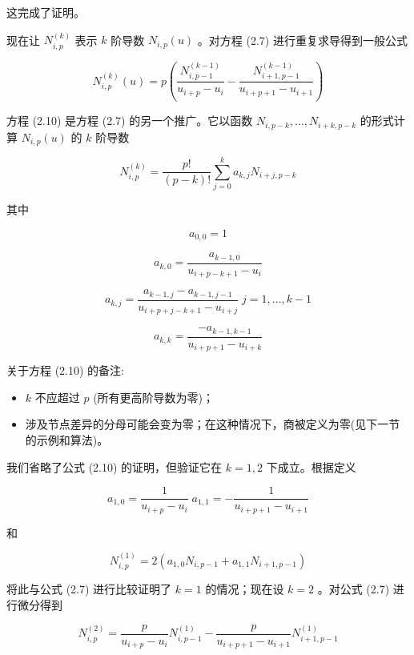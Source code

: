 \documentclass[../main.tex]{subfiles}
\begin{document}
这完成了证明。

现在让 \({N}_{i,p}^{\left( k\right) }\) 表示 \(k\) 阶导数 \({N}_{i,p}\left( u\right)\) 。对方程 (2.7) 进行重复求导得到一般公式

\[
{N}_{i,p}^{\left( k\right) }\left( u\right)  = p\left( {\frac{{N}_{i,p - 1}^{\left( k - 1\right) }}{{u}_{i + p} - {u}_{i}} - \frac{{N}_{i + 1,p - 1}^{\left( k - 1\right) }}{{u}_{i + p + 1} - {u}_{i + 1}}}\right)  \tag{2.9}
\]

方程 (2.10) 是方程 (2.7) 的另一个推广。它以函数 \({N}_{i,p - k},\ldots ,{N}_{i + k,p - k}\) 的形式计算 \({N}_{i,p}\left( u\right)\) 的 \(k\) 阶导数

\[
{N}_{i,p}^{\left( k\right) } = \frac{p!}{\left( {p - k}\right) !}\mathop{\sum }\limits_{{j = 0}}^{k}{a}_{k,j}{N}_{i + j,p - k} \tag{2.10}
\]

其中

\[
{a}_{0,0} = 1
\]

\[
{a}_{k,0} = \frac{{a}_{k - 1,0}}{{u}_{i + p - k + 1} - {u}_{i}}
\]

\[
{a}_{k,j} = \frac{{a}_{k - 1,j} - {a}_{k - 1,j - 1}}{{u}_{i + p + j - k + 1} - {u}_{i + j}}\;j = 1,\ldots ,k - 1
\]

\[
{a}_{k,k} = \frac{-{a}_{k - 1,k - 1}}{{u}_{i + p + 1} - {u}_{i + k}}
\]

关于方程 (2.10) 的备注:

\begin{itemize}
\item \(k\) 不应超过 \(p\) (所有更高阶导数为零)；
\end{itemize}

\begin{itemize}
\item 涉及节点差异的分母可能会变为零；在这种情况下，商被定义为零(见下一节的示例和算法)。
\end{itemize}

我们省略了公式 (2.10) 的证明，但验证它在 \(k = 1,2\) 下成立。根据定义

\[
{a}_{1,0} = \frac{1}{{u}_{i + p} - {u}_{i}}\;{a}_{1,1} =  - \frac{1}{{u}_{i + p + 1} - {u}_{i + 1}}
\]

和

\[
{N}_{i,p}^{\left( 1\right) } = 2\left( {{a}_{1,0}{N}_{i,p - 1} + {a}_{1,1}{N}_{i + 1,p - 1}}\right)
\]

将此与公式 (2.7) 进行比较证明了 \(k = 1\) 的情况；现在设 \(k = 2\) 。对公式 (2.7) 进行微分得到

\[
{N}_{i,p}^{\left( 2\right) } = \frac{p}{{u}_{i + p} - {u}_{i}}{N}_{i,p - 1}^{\left( 1\right) } - \frac{p}{{u}_{i + p + 1} - {u}_{i + 1}}{N}_{i + 1,p - 1}^{\left( 1\right) }
\]
\end{document}
